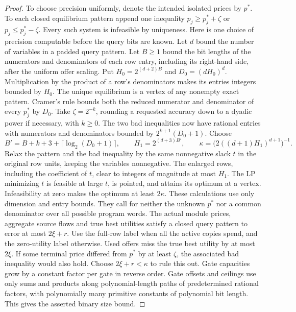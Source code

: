 \documentclass[11pt,oneside,openany,notitlepage]{report}
\begin{document}
\begin{proof}
To choose precision uniformly, denote the intended isolated prices by
\(p^*\). To each closed equilibrium pattern append one inequality
\(p_j\ge p_j^*+\zeta\) or \(p_j\le p_j^*-\zeta\). Every such system
is infeasible by uniqueness. Here is one choice of precision computable
before the query bits are known. Let \(d\) bound the number of variables
in a padded query pattern. Let \(B\ge1\) bound the bit lengths of the
numerators and denominators of each row entry, including its right-hand
side, after the uniform offer scaling. Put \(H_0=2^{(d+2)B}\) and
\(D_0=(dH_0)^d\). Multiplication by the product of a row's denominators
makes its entries integers bounded by \(H_0\). The unique equilibrium
is a vertex of any nonempty exact pattern. Cramer's rule bounds both
the reduced numerator and denominator of every \(p_j^*\) by \(D_0\).
Take \(\zeta=2^{-k}\), rounding a requested accuracy down to a dyadic
power if necessary, with \(k\ge0\). The two bad inequalities now have
rational entries with numerators and denominators bounded by
\(2^{k+1}(D_0+1)\). Choose
\[
 B'=B+k+3+\lceil\log_2(D_0+1)\rceil,\qquad
 H_1=2^{(d+3)B'},\qquad
 \kappa=\bigl(2((d+1)H_1)^{d+1}\bigr)^{-1}.
\]
Relax the pattern and the bad inequality by the same nonnegative slack
\(t\) in the original row units, keeping the variables nonnegative.
The enlarged rows, including the coefficient of \(t\), clear to integers
of magnitude at most \(H_1\). The LP minimizing \(t\) is feasible
at large \(t\), is pointed, and attains its optimum at a vertex.
Infeasibility at zero makes the optimum at least \(2\kappa\).
These calculations use only dimension and entry bounds. They call for
neither the unknown \(p^*\) nor a common denominator over all possible
program words.
The actual module prices, aggregate source flows and true best utilities
satisfy a closed query pattern to error at most \(2\xi+r\). Use the
full-row label when all the active copies spend, and the zero-utility
label otherwise. Used offers miss the true best utility by at most
\(2\xi\). If some terminal price differed from \(p^*\) by at least
\(\zeta\), the associated bad inequality would also hold. Choose
\(2\xi+r<\kappa\) to rule this out. Gate capacities grow by a constant
factor per gate in reverse order. Gate offsets and ceilings use only
sums and products along polynomial-length paths of predetermined
rational factors, with polynomially many primitive constants of
polynomial bit length. This gives the asserted binary size bound.
\end{proof}
\end{document}
